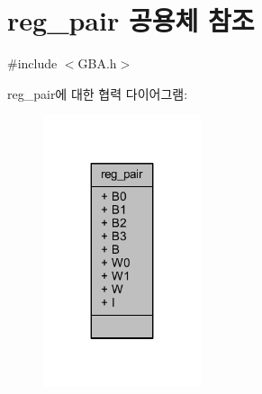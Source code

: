 \hypertarget{unionreg__pair}{}\section{reg\+\_\+pair 공용체 참조}
\label{unionreg__pair}


{\ttfamily \#include $<$G\+B\+A.\+h$>$}



reg\+\_\+pair에 대한 협력 다이어그램\+:\nopagebreak
\begin{figure}[H]
\begin{center}
\leavevmode
\includegraphics[width=131pt]{unionreg__pair__coll__graph}
\end{center}
\end{figure}

